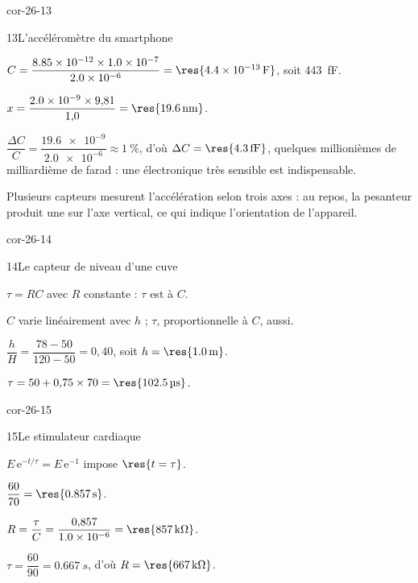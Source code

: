 \begin{blocLivre}{cor-26-13}
\begin{corrige}{13}{L'accéléromètre du smartphone}
\begin{questions}
\item $C=\dfrac{\num{8.85e-12}\times\num{1.0e-7}}{\num{2.0e-6}}=\res{\qty{4,4e-13}{F}}$, soit \qty{443}{fF}.
\item $x=\dfrac{\num{2.0e-9}\times9{,}81}{1{,}0}=\res{\qty{19,6}{nm}}$.
\item $\dfrac{\Delta C}{C}=\dfrac{\num{19.6e-9}}{\num{2.0e-6}}\approx1~\%$, d'où $\Delta C=\res{\qty{4,3}{fF}}$, quelques millionièmes de milliardième de
farad : une électronique très sensible est indispensable.
\item Plusieurs capteurs mesurent l'accélération selon trois axes : au repos, la pesanteur produit une
 sur l'axe vertical, ce qui indique l'orientation de l'appareil.
\end{questions}
\end{corrige}
\end{blocLivre}
\begin{blocLivre}{cor-26-14}
\begin{corrige}{14}{Le capteur de niveau d'une cuve}
\begin{questions}
\item $\tau=RC$ avec $R$ constante : $\tau$ est  à $C$.
\item $C$ varie linéairement avec $h$ ; $\tau$, proportionnelle à $C$, aussi.
\item $\dfrac{h}{H}=\dfrac{78-50}{120-50}=0{,}40$, soit $h=\res{\qty{1,0}{m}}$.
\item $\tau=50+0{,}75\times70=\res{\qty{102,5}{\micro s}}$.
\end{questions}
\end{corrige}
\end{blocLivre}
\begin{blocLivre}{cor-26-15}
\begin{corrige}{15}{Le stimulateur cardiaque}
\begin{questions}
\item $E\,\mathrm{e}^{-t/\tau}=E\,\mathrm{e}^{-1}$ impose $\res{t=\tau}$.
\item $\dfrac{60}{70}=\res{\qty{0,857}{s}}$.
\item $R=\dfrac{\tau}{C}=\dfrac{0{,}857}{\num{1.0e-6}}=\res{\qty{857}{k\ohm}}$.
\item $\tau=\dfrac{60}{90}=\qty{0,667}{s}$, d'où $R=\res{\qty{667}{k\ohm}}$.
\end{questions}
\end{corrige}
\end{blocLivre}
